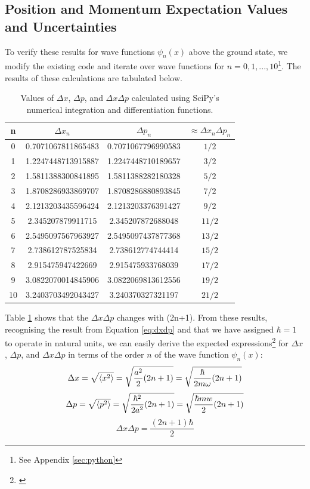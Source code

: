 \documentclass[a4paper]{article}
\begin{document}
\subsection{Position and Momentum Expectation Values and Uncertainties}
To verify these results for wave functions $\psi_n(x)$ above the ground state, we modify the existing code and iterate over wave functions for $n=0, 1, ..., 10$\footnote{See Appendix \ref{sec:python}}. The results of these calculations are tabulated below. 
  \begin{table}[h!]
  \centering
  \begin{tabular}{cccc}
  n     & $\Delta x_n$       & $\Delta p_n$       & $\approx\Delta x_n\Delta p_n$ \\\hline
  0     & 0.7071067811865483 & 0.7071067796990583 & $1/2$ \\
  1     & 1.2247448713915887 & 1.2247448710189657 & $3/2$ \\
  2     & 1.5811388300841895 & 1.5811388282180328 & $5/2$ \\
  3     & 1.8708286933869707 & 1.8708286880893845 & $7/2$ \\
  4     & 2.1213203435596424 & 2.1213203376391427 & $9/2$ \\
  5     & 2.345207879911715  & 2.345207872688048  & $11/2$ \\
  6     & 2.5495097567963927 & 2.5495097437877368 & $13/2$ \\
  7     & 2.738612787525834  & 2.738612774744414  & $15/2$ \\
  8     & 2.915475947422669  & 2.915475933768039  & $17/2$ \\
  9     & 3.0822070014845906 & 3.0822069813612556 & $19/2$ \\
  10    & 3.2403703492043427 & 3.240370327321197  & $21/2$ 
  \end{tabular}
  \caption{\label{tab:0to10}Values of $\Delta x$, $\Delta p$, and $\Delta x\Delta p$ calculated using SciPy's numerical integration and differentiation functions.}
  \end{table}
\newpage
Table \ref{tab:0to10} shows that the $\Delta x\Delta p$ changes with (2n+1).
From these results, recognising the result from Equation \ref{eq:dxdp} and that we have assigned $\hbar =1$ to operate in natural units, we can easily derive the expected expressions\footnote{\cite[\S9.2 Eq7$\sim$p.83]{pao:2012}} for $\Delta x$, $\Delta p$, and $\Delta x\Delta p$ in terms of the order $n$ of the wave function $\psi_n(x)$:
\begin{equation} \label{eq:un_x}
\Delta x=\sqrt{\expval{x^2}}=\sqrt{\frac{a^2}2(2n+1)}=\sqrt{\frac\hbar{2m\omega}(2n+1)}
\end{equation}
\begin{equation} \label{eq:un_p}
\Delta p=\sqrt{\expval{p^2}}=\sqrt{\frac{\hbar^2}{2a^2}(2n+1)}=\sqrt{\frac{\hbar mw}2(2n+1)}
\end{equation}
\begin{equation}
\Delta x\Delta p=\frac{(2n+1)\hbar}2
\end{equation}
\end{document}
